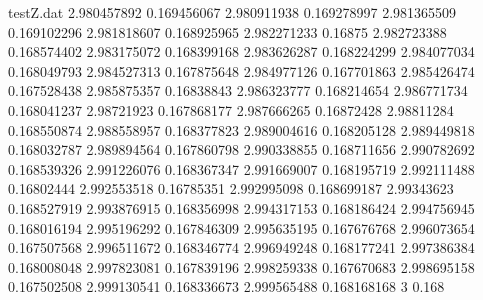 \begin{filecontents*}{testZ.dat}
2.980457892  0.169456067
2.980911938  0.169278997
2.981365509  0.169102296
2.981818607  0.168925965
2.982271233  0.16875
2.982723388  0.168574402
2.983175072  0.168399168
2.983626287  0.168224299
2.984077034  0.168049793
2.984527313  0.167875648
2.984977126  0.167701863
2.985426474  0.167528438
2.985875357  0.16838843
2.986323777  0.168214654
2.986771734  0.168041237
2.98721923  0.167868177
2.987666265  0.16872428
2.98811284  0.168550874
2.988558957  0.168377823
2.989004616  0.168205128
2.989449818  0.168032787
2.989894564  0.167860798
2.990338855  0.168711656
2.990782692  0.168539326
2.991226076  0.168367347
2.991669007  0.168195719
2.992111488  0.16802444
2.992553518  0.16785351
2.992995098  0.168699187
2.99343623  0.168527919
2.993876915  0.168356998
2.994317153  0.168186424
2.994756945  0.168016194
2.995196292  0.167846309
2.995635195  0.167676768
2.996073654  0.167507568
2.996511672  0.168346774
2.996949248  0.168177241
2.997386384  0.168008048
2.997823081  0.167839196
2.998259338  0.167670683
2.998695158  0.167502508
2.999130541  0.168336673
2.999565488  0.168168168
3  0.168
\end{filecontents*}